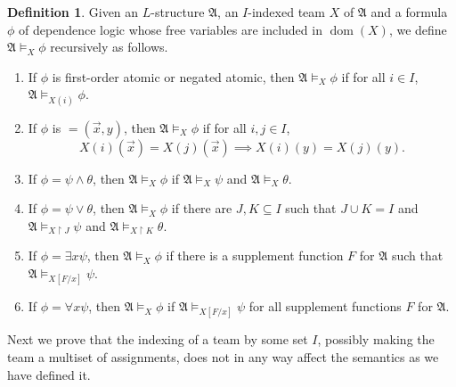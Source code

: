 \documentclass[12pt]{article}
\theoremstyle{definition}
\newtheorem{definition}{Definition}[section]
\newcommand{\A}{\mathfrak{A}}
\newcommand{\dep}{\mathop{=}}
\DeclareMathOperator{\dom}{dom}
\begin{document}
\begin{definition}
    Given an $L$-structure $\A$, an $I$-indexed team $X$ of $\A$ and a formula $\phi$ of dependence logic whose free variables are included in $\dom(X)$, we define $\A\models_X\phi$ recursively as follows.
    \begin{enumerate}
        \item If $\phi$ is first-order atomic or negated atomic, then $\A\models_X\phi$ if for all $i\in I$, $\A\models_{X(i)}\phi$.
        \item If $\phi$ is $\dep(\vec x,y)$, then $\A\models_X\phi$ if for all $i,j\in I$,
        \[
            X(i)(\vec x) = X(j)(\vec x) \implies X(i)(y) = X(j)(y).
        \]
        \item If $\phi = \psi\land\theta$, then $\A\models_X\phi$ if $\A\models_X\psi$ and $\A\models_X\theta$.
        \item If $\phi = \psi\lor\theta$, then $\A\models_X\phi$ if there are $J,K\subseteq I$ such that $J\cup K = I$ and $\A\models_{X\restriction J}\psi$ and $\A\models_{X\restriction K}\theta$.
        \item If $\phi = \exists x \psi$, then $\A\models_X\phi$ if there is a supplement function $F$ for $\A$ such that $\A\models_{X[F/x]}\psi$.
        \item If $\phi = \forall x\psi$, then $\A\models_X\phi$ if $\A\models_{X[F/x]}\psi$ for all supplement functions $F$ for $\A$.
    \end{enumerate}
\end{definition}

Next we prove that the indexing of a team by some set $I$, possibly making the team a multiset of assignments, does not in any way affect the semantics as we have defined it.
\end{document}
